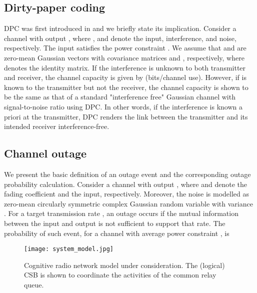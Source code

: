 \documentclass[journal,twocolumn]{IEEEtran}
\begin{document}
\subsection{Dirty-paper coding}
\label{dpc}
DPC was first introduced in \cite{DPC} and we briefly state its implication. Consider a channel with output , where ,  and  denote the input, interference, and noise, respectively. The input  satisfies the power constraint . We assume that  and  are zero-mean Gaussian vectors with covariance matrices  and
, respectively, where  denotes the  identity matrix. If the interference  is unknown to both transmitter and receiver, the channel capacity is given by  (bits/channel use).
However, if  is known to the transmitter but not the receiver, the channel capacity is shown to be the same as that of a standard "interference free" Gaussian channel with signal-to-noise ratio  using DPC.
In other words, if the interference is known a priori at the transmitter, DPC renders the link between the transmitter and its intended receiver interference-free.

\subsection{Channel outage}\label{Channel_Outage}
We present the basic definition of an outage event and the corresponding outage probability calculation. Consider a channel with output
, where  and  denote the fading coefficient and the input, respectively. Moreover, the noise  is modelled as zero-mean circularly symmetric complex Gaussian random variable with variance . For a target transmission rate , an outage occurs if the mutual information between the input and output is not sufficient to support that rate. The probability of such event, for a channel with average power constraint , is


\begin{figure}[t]
\begin{center}
\texttt{[image: system\_model.jpg]}
\caption{Cognitive radio network model under consideration. The (logical) CSB is shown to coordinate the activities of the common relay queue.} \label{Fig1}
\end{center}
\end{figure}
\end{document}
